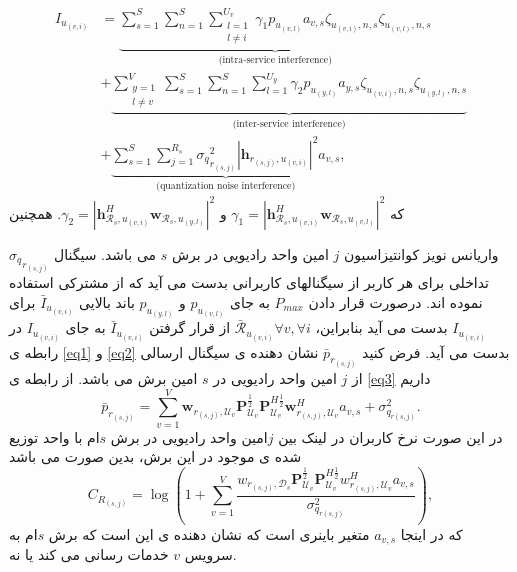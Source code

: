 \begin{equation}
\begin{split}
 I_{u_{(v,i)}} &=
 \underbrace{\sum_{s=1}^{S}\sum_{n=1}^{S}\sum_{\substack{l=1 \\ l\neq i}}^{{U}_v} \gamma_{1}  p_{u_{(v,l)}}a_{v,s}\zeta_{u_(v,i),n,s}\zeta_{u_(v,l),n,s}}_{\text{(intra-service interference)}}\\
&+ \underbrace{\sum_{\substack{y=1 \\ l\neq v}}^{V}\sum_{s=1}^{S}\sum_{n=1}^{S}\sum_{l=1}^{{U}_y} \gamma_{2}  p_{u_{(y,l)}}a_{y,s} \zeta_{u_(v,i),n,s}\zeta_{u_(y,l),n,s}}_{\text{(inter-service interference)}}\\
&+\underbrace{ \sum_{s=1}^{S} \sum_{j=1}^{{R}_s} {\sigma_q}_{r_{(s,j)}}^2 |\boldsymbol{h}_{r_{(s,j)}, u_{(v,i)}}|^2 a_{v,s}}_{\text{(quantization noise interference)}},
\end{split}
\end{equation}
که 
$\gamma_{1} =|\boldsymbol{h}_{\mathcal{R}_s, u_{(v,i)}}^H \boldsymbol{w}_{\mathcal{R}_{s},u_{(v,l)}}|^2$
و 
$\gamma_{2} =|\boldsymbol{h}_{\mathcal{R}_s, u_{(v,i)}}^H \boldsymbol{w}_{\mathcal{R}_{s},u_{(y,l)}}|^2$.
همچنین 

${\sigma_q}_{r_{(s,j)}}$
واریانس نویز کوانتیزاسیون
$j$
امین 
واحد رادیویی در برش $s$ می باشد.
سیگنال تداخلی برای هر کاربر از سیگنالهای کاربرانی بدست می آید که از  مشترکی استفاده نموده اند.
درصورت قرار دادن $P_{max}$
به جای 
$p_{u_{(v,l)}}$
و 
$p_{u_{(y,l)}}$
باند بالایی  
$\bar{I}_{u_{(v,i)}}$
برای 
$I_{u_{(v,i)}}$
بدست می آید
بنابراین،
$\bar{\mathcal{R}}_{u_{(v,i)}} \forall v , \forall i$ 
از قرار گرفتن 
$\bar{I}_{u_{(v,i)}}$
به جای 
$I_{u_{(v,i)}}$
در رابطه ی 
\eqref{eq1} و \eqref{eq2}
بدست می آید.
\newline
فرض کنید $\bar{p}_{r_{(s,j)}}$
نشان دهنده ی سیگنال ارسالی از $j$ امین واحد رادیویی در $s$ امین برش می باشد.
از رابطه ی \eqref{eq3} داریم
\begin{equation}
\bar{p}_{r_{(s,j)}} = \sum_{v=1}^{V}\boldsymbol{w}_{r_{(s,j)},\mathcal{U}_{v}} \boldsymbol{P}_{\mathcal{U}_v}^{\frac{1}{2}} \boldsymbol{P}_{\mathcal{U}_v}^{H \frac{1}{2}}   \boldsymbol{w}_{r_{(s,j)},\mathcal{U}_{v}}^H a_{v,s} + \sigma_{q_{r(s,j)}}^2.
\end{equation}
در این صورت نرخ کاربران در لینک  بین $j$امین واحد رادیویی در برش $s$ام با واحد توزیع شده ی موجود در این برش، بدین صورت می باشد  \cite{simeone2016cloud, 1111}
\begin{equation}
C_{R_{(s,j)}} = \log{(1+\sum_{v=1}^{V}\frac{w_{r_{(s,j)},\mathcal{D}_{s}} \boldsymbol{P}_{\mathcal{U}_v}^{\frac{1}{2}} \boldsymbol{P}_{\mathcal{U}_v}^{H \frac{1}{2}}   w_{r_{(s,j)},\mathcal{U}_{v}}^H a_{v,s}}{ \sigma_{q_{r(s,j)}}^2})},
\end{equation}
که در اینجا 
$a_{v,s}$
متغیر باینری است که نشان دهنده ی این است که برش $s$ام به سرویس $v$ خدمات رسانی می کند یا نه.

